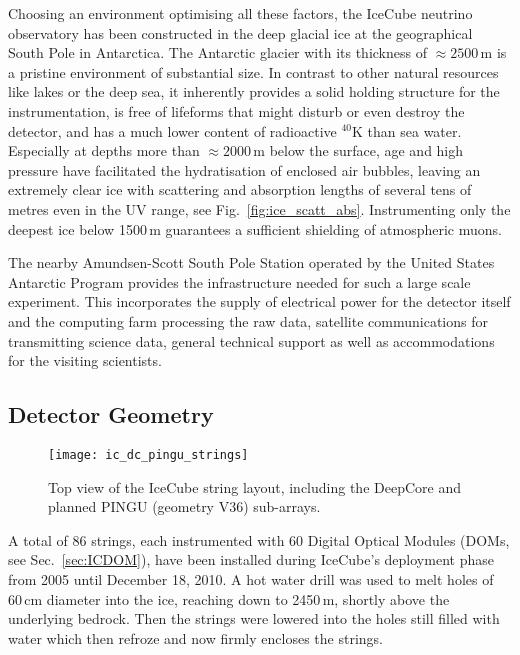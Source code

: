 Choosing an environment optimising all these factors, the IceCube neutrino 
observatory has been constructed in the deep glacial ice at the geographical 
South Pole in Antarctica. The Antarctic glacier with its thickness of $\approx 
2500$\,m is a pristine environment of substantial size. In contrast to other
natural 
resources like lakes or the deep sea, it inherently provides a solid holding 
structure for the instrumentation, is free of lifeforms that might disturb or 
even destroy the detector, and has a much lower content of radioactive $^{40}$K 
than sea water. Especially at depths more than $\approx 2000$\,m below the 
surface, age and high pressure have facilitated the hydratisation of enclosed 
air bubbles, leaving an extremely clear ice with scattering and absorption 
lengths of several tens of metres even in the UV range, see 
Fig.~\ref{fig:ice_scatt_abs}. Instrumenting only the deepest ice below 1500\,m 
guarantees a sufficient shielding of atmospheric muons. 

The nearby Amundsen-Scott South Pole Station operated by the United States 
Antarctic Program provides the infrastructure needed for such a large scale 
experiment. This incorporates the supply of electrical power for the detector 
itself and the computing farm processing the raw data, satellite communications 
for transmitting science data, general technical support as well as 
accommodations for the visiting scientists.

\subsection{Detector Geometry}
\label{sec:ICgeometry}

\begin{figure}[thp]
 \centering
 \texttt{[image: ic\_dc\_pingu\_strings]}
 \caption{Top view of the IceCube string layout, including the DeepCore and
planned PINGU (geometry V36) sub-arrays.}
 \label{fig:string_layout}
\end{figure}

A total of 86 strings, each instrumented with 60 Digital Optical Modules (DOMs, 
see Sec.~\ref{sec:ICDOM}), have been installed during IceCube's deployment phase 
from 2005 until December 18, 2010. A hot water drill was used to melt holes of 
60\,cm diameter into the ice, reaching down to 2450\,m, shortly above the 
underlying bedrock. Then the strings were lowered into the holes still filled 
with water which then refroze and now firmly encloses the strings.

